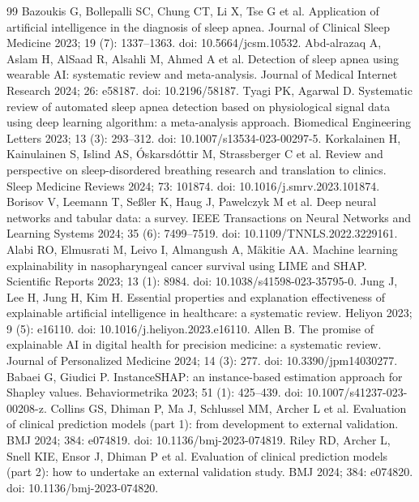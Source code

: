 \documentclass{elektr}
\begin{document}
\begin{thebibliography}{99}
 Bazoukis G, Bollepalli SC, Chung CT, Li X, Tse G et al. Application of artificial intelligence in the diagnosis of sleep apnea. Journal of Clinical Sleep Medicine 2023; 19 (7): 1337--1363. doi: 10.5664/jcsm.10532.
 Abd-alrazaq A, Aslam H, AlSaad R, Alsahli M, Ahmed A et al. Detection of sleep apnea using wearable AI: systematic review and meta-analysis. Journal of Medical Internet Research 2024; 26: e58187. doi: 10.2196/58187.
 Tyagi PK, Agarwal D. Systematic review of automated sleep apnea detection based on physiological signal data using deep learning algorithm: a meta-analysis approach. Biomedical Engineering Letters 2023; 13 (3): 293--312. doi: 10.1007/s13534-023-00297-5.
 Korkalainen H, Kainulainen S, Islind AS, {\'{O}}skarsd{\'{o}}ttir M, Strassberger C et al. Review and perspective on sleep-disordered breathing research and translation to clinics. Sleep Medicine Reviews 2024; 73: 101874. doi: 10.1016/j.smrv.2023.101874.
 Borisov V, Leemann T, Se{\ss}ler K, Haug J, Pawelczyk M et al. Deep neural networks and tabular data: a survey. IEEE Transactions on Neural Networks and Learning Systems 2024; 35 (6): 7499--7519. doi: 10.1109/\allowbreak TNNLS.2022.3229161.
 Alabi RO, Elmusrati M, Leivo I, Almangush A, M{\"a}kitie AA. Machine learning explainability in nasopharyngeal cancer survival using LIME and SHAP. Scientific Reports 2023; 13 (1): 8984. doi: 10.1038/s41598-023-35795-0.
 Jung J, Lee H, Jung H, Kim H. Essential properties and explanation effectiveness of explainable artificial intelligence in healthcare: a systematic review. Heliyon 2023; 9 (5): e16110. doi: 10.1016/j.heliyon.2023.e16110.
 Allen B. The promise of explainable AI in digital health for precision medicine: a systematic review. Journal of Personalized Medicine 2024; 14 (3): 277. doi: 10.3390/jpm14030277.
 Babaei G, Giudici P. InstanceSHAP: an instance-based estimation approach for Shapley values. Behaviormetrika 2023; 51 (1): 425--439. doi: 10.1007/s41237-023-00208-z.
 Collins GS, Dhiman P, Ma J, Schlussel MM, Archer L et al. Evaluation of clinical prediction models (part 1): from development to external validation. BMJ 2024; 384: e074819. doi: 10.1136/bmj-2023-074819.
 Riley RD, Archer L, Snell KIE, Ensor J, Dhiman P et al. Evaluation of clinical prediction models (part 2): how to undertake an external validation study. BMJ 2024; 384: e074820. doi: 10.1136/bmj-2023-074820.

\end{thebibliography}
\end{document}

